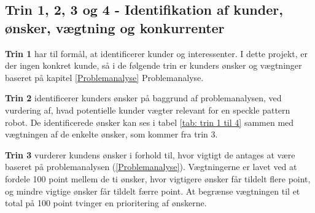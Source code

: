 \subsection{Trin 1, 2, 3 og 4 - Identifikation af kunder, ønsker, vægtning og konkurrenter} \label{Trin 1-4}

\textbf{Trin 1} har til formål, at identificerer kunder og interessenter. I dette projekt, er der ingen konkret kunde, så i de følgende trin er kunders ønsker og vægtninger baseret på kapitel \ref{Problemanalyse} Problemanalyse. 
 
\textbf{Trin 2} identificerer kunders ønsker på baggrund af problemanalysen, ved vurdering af, hvad potentielle kunder vægter relevant for en speckle pattern robot. De identificerede ønsker kan ses i tabel \ref{tab: trin 1 til 4} sammen med vægtningen af de enkelte ønsker, som kommer fra trin 3. 

\textbf{Trin 3} vurderer kundens ønsker i forhold til, hvor vigtigt de antages at være baseret på problemanalysen (\ref{Problemanalyse}). Vægtningerne er lavet ved at fordele 100 point mellem de ti ønsker, hvor vigtigere ønsker får tildelt flere point, og mindre vigtige ønsker får tildelt færre point. At begrænse vægtningen til et total på 100 point tvinger en prioritering af ønskerne. 

